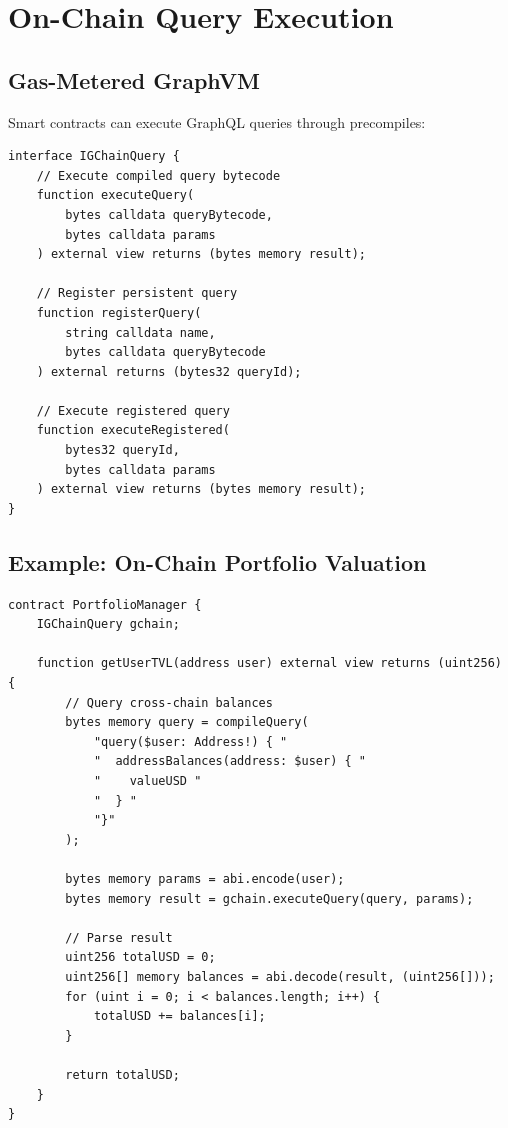 \section{On-Chain Query Execution}


\subsection{Gas-Metered GraphVM}

Smart contracts can execute GraphQL queries through precompiles:

\begin{lstlisting}[language=Solidity, basicstyle=\small\ttfamily]
interface IGChainQuery {
    // Execute compiled query bytecode
    function executeQuery(
        bytes calldata queryBytecode,
        bytes calldata params
    ) external view returns (bytes memory result);
    
    // Register persistent query
    function registerQuery(
        string calldata name,
        bytes calldata queryBytecode
    ) external returns (bytes32 queryId);
    
    // Execute registered query
    function executeRegistered(
        bytes32 queryId,
        bytes calldata params
    ) external view returns (bytes memory result);
}
\end{lstlisting}

\subsection{Example: On-Chain Portfolio Valuation}

\begin{lstlisting}[language=Solidity, basicstyle=\small\ttfamily]
contract PortfolioManager {
    IGChainQuery gchain;
    
    function getUserTVL(address user) external view returns (uint256) {
        // Query cross-chain balances
        bytes memory query = compileQuery(
            "query($user: Address!) { "
            "  addressBalances(address: $user) { "
            "    valueUSD "
            "  } "
            "}"
        );
        
        bytes memory params = abi.encode(user);
        bytes memory result = gchain.executeQuery(query, params);
        
        // Parse result
        uint256 totalUSD = 0;
        uint256[] memory balances = abi.decode(result, (uint256[]));
        for (uint i = 0; i < balances.length; i++) {
            totalUSD += balances[i];
        }
        
        return totalUSD;
    }
}
\end{lstlisting}

